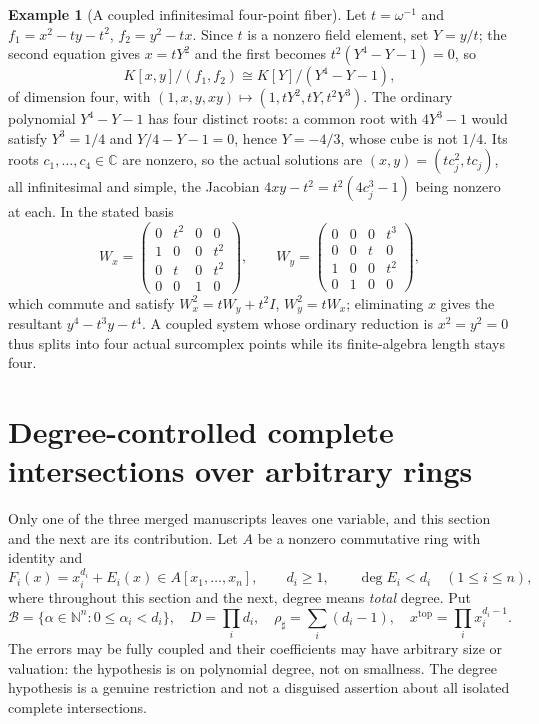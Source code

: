 \documentclass[11pt,letterpaper]{article}
\numberwithin{equation}{section}
\theoremstyle{definition}
\newtheorem{example}[theorem]{Example}
\theoremstyle{remark}\newtheorem{remark}[theorem]{Remark}
\newcommand{\C}{\mathbb C}
\newcommand{\N}{\mathbb N}
\begin{document}
\begin{example}[A coupled infinitesimal four-point fiber]\label{polynomial:ex:coupled}
Let $t=\omega^{-1}$ and $f_1=x^2-ty-t^2$, $f_2=y^2-tx$. Since $t$ is a nonzero
field element, set $Y=y/t$; the second equation gives $x=tY^2$ and the first
becomes $t^2(Y^4-Y-1)=0$, so
\begin{equation}\label{polynomial:eq:couplediso}
 K[x,y]/(f_1,f_2)\cong K[Y]/(Y^4-Y-1),
\end{equation}
of dimension four, with $(1,x,y,xy)\mapsto(1,tY^2,tY,t^2Y^3)$. The ordinary
polynomial $Y^4-Y-1$ has four distinct roots: a common root with $4Y^3-1$
would satisfy $Y^3=1/4$ and $Y/4-Y-1=0$, hence $Y=-4/3$, whose cube is not
$1/4$. Its roots $c_1,\ldots,c_4\in\C$ are nonzero, so the actual solutions
are $(x,y)=(tc_j^2,tc_j)$, all infinitesimal and simple, the Jacobian
$4xy-t^2=t^2(4c_j^3-1)$ being nonzero at each. In the stated basis
\[
 W_x=\begin{pmatrix}0&t^2&0&0\\1&0&0&t^2\\0&t&0&t^2\\0&0&1&0\end{pmatrix},
 \qquad
 W_y=\begin{pmatrix}0&0&0&t^3\\0&0&t&0\\1&0&0&t^2\\0&1&0&0\end{pmatrix},
\]
which commute and satisfy $W_x^2=tW_y+t^2I$, $W_y^2=tW_x$; eliminating $x$
gives the resultant $y^4-t^3y-t^4$. A coupled system whose ordinary reduction
is $x^2=y^2=0$ thus splits into four actual surcomplex points while its
finite-algebra length stays four.
\end{example}

\section{Degree-controlled complete intersections over arbitrary rings}
\label{polynomial:sec:globalci}
Only one of the three merged manuscripts leaves one variable, and this section
and the next are its contribution. Let $A$ be a nonzero commutative ring with
identity and
\begin{equation}\label{polynomial:eq:polysystem}
 F_i(x)=x_i^{d_i}+E_i(x)\in A[x_1,\ldots,x_n],\qquad d_i\ge1,\qquad
 \deg E_i<d_i\quad(1\le i\le n),
\end{equation}
where throughout this section and the next, degree means \emph{total} degree.
Put
\[
 \mathcal B=\{\alpha\in\N^n:0\le\alpha_i<d_i\},\quad
 D=\prod_id_i,\quad \rho_\sharp=\sum_i(d_i-1),\quad
 x^{\mathrm{top}}=\prod_ix_i^{d_i-1}.
\]
The errors may be fully coupled and their coefficients may have arbitrary size
or valuation: the hypothesis is on polynomial degree, not on smallness. The
degree hypothesis is a genuine restriction and not a disguised assertion about
all isolated complete intersections.
\end{document}
